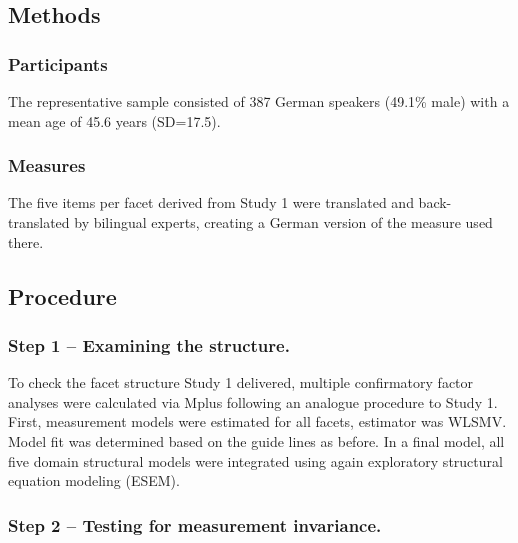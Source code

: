 \documentclass[floatsintext,man]{apa6}
\theoremstyle{definition}
\theoremstyle{definition}
\theoremstyle{definition}
\theoremstyle{remark}
\begin{document}
\hypertarget{methods-1}{%
\subsection{Methods}\label{methods-1}}

\hypertarget{participants-1}{%
\subsubsection{Participants}\label{participants-1}}

The representative sample consisted of 387 German speakers (49.1\% male)
with a mean age of 45.6 years (SD=17.5).

\hypertarget{measures}{%
\subsubsection{Measures}\label{measures}}

The five items per facet derived from Study 1 were translated and
back-translated by bilingual experts, creating a German version of the
measure used there.

\hypertarget{procedure-1}{%
\subsection{Procedure}\label{procedure-1}}

\hypertarget{step-1-examining-the-structure.}{%
\subsubsection{Step 1 -- Examining the
structure.}\label{step-1-examining-the-structure.}}

To check the facet structure Study 1 delivered, multiple confirmatory
factor analyses were calculated via Mplus following an analogue
procedure to Study 1. First, measurement models were estimated for all
facets, estimator was WLSMV. Model fit was determined based on the guide
lines as before. In a final model, all five domain structural models
were integrated using again exploratory structural equation modeling
(ESEM).

\hypertarget{step-2-testing-for-measurement-invariance.}{%
\subsubsection{Step 2 -- Testing for measurement
invariance.}\label{step-2-testing-for-measurement-invariance.}}
\end{document}
